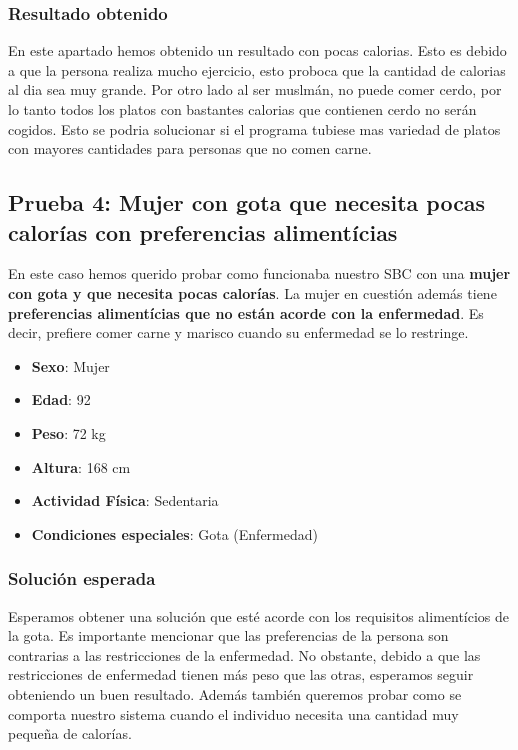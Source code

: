 \documentclass[11]{article}
\begin{document}
\subsubsection{Resultado obtenido}

En este apartado hemos obtenido un resultado con pocas calorias. Esto es debido a que la persona realiza mucho ejercicio, esto proboca que la cantidad de calorias al dia sea muy grande. Por otro lado al ser muslmán, no puede comer cerdo, por lo tanto todos los platos con bastantes calorias que contienen cerdo no serán cogidos.
Esto se podria solucionar si el programa tubiese mas variedad de platos con mayores cantidades para personas que no comen carne.

\subsection{Prueba 4: Mujer con gota que necesita pocas calorías con preferencias alimentícias}

En este caso hemos querido probar como funcionaba nuestro SBC con una \textbf{mujer con gota y que necesita pocas calorías}. La mujer en cuestión además tiene \textbf{preferencias alimentícias que no están acorde con la enfermedad}. Es decir, prefiere comer carne y marisco cuando su enfermedad se lo restringe. 

\begin{itemize}
\item \textbf{Sexo}: Mujer
\item \textbf{Edad}: 92
\item \textbf{Peso}: 72 kg 
\item \textbf{Altura}: 168 cm
\item \textbf{Actividad Física}: Sedentaria
\item \textbf{Condiciones especiales}: Gota (Enfermedad)
\end{itemize}

\subsubsection{Solución esperada}
Esperamos obtener una solución que esté acorde con los requisitos alimentícios de la gota. Es importante mencionar que las preferencias de la persona son contrarias a las restricciones de la enfermedad. No obstante, debido a que las restricciones de enfermedad tienen más peso que las otras, esperamos seguir obteniendo un buen resultado. Además también queremos probar como se comporta nuestro sistema cuando el individuo necesita una cantidad muy pequeña de calorías. 
\end{document}
